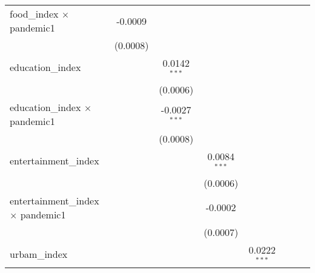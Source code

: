 \begin{table}[htbp]
\begin{tabular}{lccccccc}
      food\_index $\times$ pandemic1             & -0.0009                 &                         &                         &                         &                &                 &   \\   
                                                 & (0.0008)                &                         &                         &                         &                &                 &   \\   
      education\_index                           &                         & 0.0142$^{***}$          &                         &                         &                &                 &   \\   
                                                 &                         & (0.0006)                &                         &                         &                &                 &   \\   
      education\_index $\times$ pandemic1        &                         & -0.0027$^{***}$         &                         &                         &                &                 &   \\   
                                                 &                         & (0.0008)                &                         &                         &                &                 &   \\   
      entertainment\_index                       &                         &                         & 0.0084$^{***}$          &                         &                &                 &   \\   
                                                 &                         &                         & (0.0006)                &                         &                &                 &   \\   
      entertainment\_index $\times$ pandemic1    &                         &                         & -0.0002                 &                         &                &                 &   \\   
                                                 &                         &                         & (0.0007)                &                         &                &                 &   \\   
      urbam\_index                               &                         &                         &                         & 0.0222$^{***}$          &                &                 &   \\   

\end{tabular}
\end{table}

